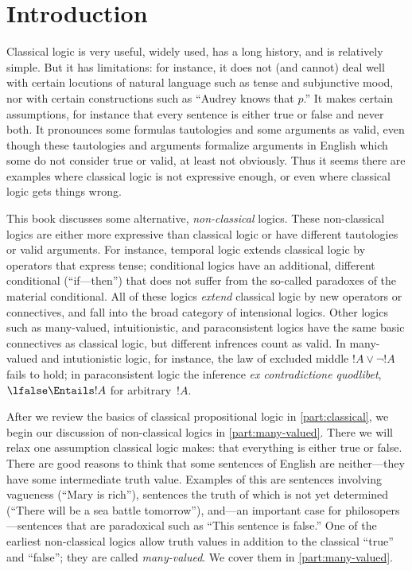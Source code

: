 
\chapter{Introduction}

Classical logic is very useful, widely used, has a long
history, and is relatively simple.  But it has limitations: for
instance, it does not (and cannot) deal well with certain locutions of
natural language such as tense and subjunctive mood, nor with certain
constructions such as ``Audrey knows that $p$.'' It makes certain
assumptions, for instance that every sentence is either true or false
and never both.  It pronounces some formulas tautologies and some
arguments as valid, even though these tautologies and arguments
formalize arguments in English which some do not consider true or
valid, at least not obviously.  Thus it seems there are examples where
classical logic is not expressive enough, or even where classical
logic gets things wrong.

This book discusses some alternative, \emph{non-classical}
logics. These non-classical logics are either more expressive than
classical logic or have different tautologies or valid arguments. For
instance, temporal logic extends classical logic by operators that
express tense; conditional logics have an additional, different
conditional (``if---then'') that does not suffer from the so-called
paradoxes of the material conditional.  All of these logics
\emph{extend} classical logic by new operators or connectives, and
fall into the broad category of intensional logics. Other logics such
as many-valued, intuitionistic, and paraconsistent logics have the
same basic connectives as classical logic, but different infrences
count as valid.  In many-valued and intutionistic logic, for instance,
the law of excluded middle $!A \lor \lnot !A$ fails to hold; in
paraconsistent logic the inference \emph{ex contradictione quodlibet},
$\lfalse \Entails !A$ for arbitrary~$!A$.

After we review the basics of classical propositional logic in
\cref{part:classical}, we begin our discussion of non-classical logics
in \ref{part:many-valued}. There we will relax one assumption
classical logic makes: that everything is either true or false. There
are good reasons to think that some sentences of English are
neither---they have some intermediate truth value. Examples of this
are sentences involving vagueness (``Mary is rich''), sentences the
truth of which is not yet determined (``There will be a sea battle
tomorrow''), and---an important case for philosopers---sentences that
are paradoxical such as ``This sentence is false.'' One of the
earliest non-classical logics allow truth values in addition to the
classical ``true'' and ``false''; they are called \emph{many-valued}.
We cover them in \cref{part:many-valued}.

